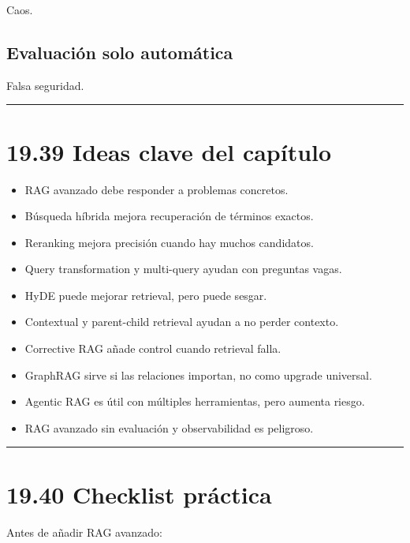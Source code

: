 Caos.

\subsection{Evaluación solo
automática}\label{evaluaciuxf3n-solo-automuxe1tica}

Falsa seguridad.

\begin{center}\rule{0.5\linewidth}{0.5pt}\end{center}

\section{19.39 Ideas clave del
capítulo}\label{ideas-clave-del-capuxedtulo-18}

\begin{itemize}
\tightlist
\item
  RAG avanzado debe responder a problemas concretos.
\item
  Búsqueda híbrida mejora recuperación de términos exactos.
\item
  Reranking mejora precisión cuando hay muchos candidatos.
\item
  Query transformation y multi-query ayudan con preguntas vagas.
\item
  HyDE puede mejorar retrieval, pero puede sesgar.
\item
  Contextual y parent-child retrieval ayudan a no perder contexto.
\item
  Corrective RAG añade control cuando retrieval falla.
\item
  GraphRAG sirve si las relaciones importan, no como upgrade universal.
\item
  Agentic RAG es útil con múltiples herramientas, pero aumenta riesgo.
\item
  RAG avanzado sin evaluación y observabilidad es peligroso.
\end{itemize}

\begin{center}\rule{0.5\linewidth}{0.5pt}\end{center}

\section{19.40 Checklist práctica}\label{checklist-pruxe1ctica-18}

Antes de añadir RAG avanzado:

